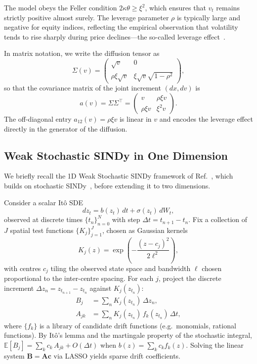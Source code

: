 \documentclass[reprint, amsmath, amssymb, aps, prl, superscriptaddress, nofootinbib]{revtex4-2}
\begin{document}
The model obeys the Feller condition $2\kappa\theta \geq \xi^2$, which ensures
that $v_t$ remains strictly positive almost surely. The leverage parameter $\rho$
is typically large and negative for equity indices, reflecting the empirical
observation that volatility tends to rise sharply during price declines---the so-called
leverage effect~\cite{Black1976,Christie1982}.

In matrix notation, we write the diffusion tensor as
\begin{equation}
  \Sigma(v) = \begin{pmatrix} \sqrt{v} & 0 \\ \rho\xi\sqrt{v} & \xi\sqrt{v}\sqrt{1-\rho^2} \end{pmatrix},
\end{equation}
so that the covariance matrix of the joint increment $(dx, dv)$ is
\begin{equation}
  a(v) = \Sigma\Sigma^\top =
  \begin{pmatrix} v & \rho\xi v \\ \rho\xi v & \xi^2 v \end{pmatrix}.
\end{equation}
The off-diagonal entry $a_{12}(v) = \rho\xi v$ is linear in $v$ and encodes the
leverage effect directly in the generator of the diffusion.

\subsection{Weak Stochastic SINDy in One Dimension}

We briefly recall the 1D Weak Stochastic SINDy framework of
Ref.~\cite{EshwarHonnavar2026}, which builds on stochastic SINDy~\cite{BoninsegnaEtAl2018,LiEtAl2021},
before extending it to two dimensions.

Consider a scalar It\^{o} SDE
\begin{equation}
  dz_t = b(z_t)\,dt + \sigma(z_t)\,dW_t,
\end{equation}
observed at discrete times $\{t_n\}_{n=0}^{N}$ with step $\Delta t = t_{n+1}-t_n$.
Fix a collection of $J$ spatial test functions $\{K_j\}_{j=1}^{J}$, chosen as
Gaussian kernels
\begin{equation}
  K_j(z) = \exp\!\left(-\frac{(z-c_j)^2}{2\ell^2}\right),
\end{equation}
with centres $c_j$ tiling the observed state space and bandwidth $\ell$ chosen
proportional to the inter-centre spacing. For each $j$, project the discrete
increment $\Delta z_n = z_{t_{n+1}} - z_{t_n}$ against $K_j(z_{t_n})$:
\begin{align}
  B_j &= \sum_{n} K_j(z_{t_n})\,\Delta z_n, \label{eq:B_j}\\
  A_{jk} &= \sum_{n} K_j(z_{t_n})\,f_k(z_{t_n})\,\Delta t, \label{eq:A_jk}
\end{align}
where $\{f_k\}$ is a library of candidate drift functions (e.g.\ monomials,
rational functions). By It\^{o}'s lemma and the martingale property of the
stochastic integral, $\mathbb{E}[B_j] = \sum_k c_k\, A_{jk} + O(\Delta t)$ when
$b(z) = \sum_k c_k f_k(z)$. Solving the linear system $\mathbf{B} = \mathbf{A}\mathbf{c}$
via LASSO yields sparse drift coefficients.
\end{document}
